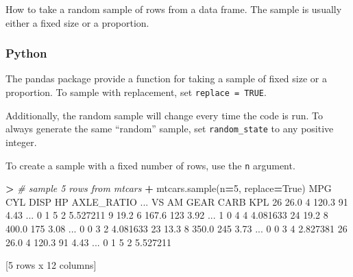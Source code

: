 \documentclass[
]{book}
\newenvironment{Shaded}{\begin{snugshade}}{\end{snugshade}}
\newcommand{\CommentTok}[1]{\textcolor[rgb]{0.56,0.35,0.01}{\textit{#1}}}
\newcommand{\DecValTok}[1]{\textcolor[rgb]{0.00,0.00,0.81}{#1}}
\newcommand{\FloatTok}[1]{\textcolor[rgb]{0.00,0.00,0.81}{#1}}
\newcommand{\NormalTok}[1]{#1}
\newcommand{\OperatorTok}[1]{\textcolor[rgb]{0.81,0.36,0.00}{\textbf{#1}}}
\newcommand{\VariableTok}[1]{\textcolor[rgb]{0.00,0.00,0.00}{#1}}
\begin{document}
How to take a random sample of rows from a data frame. The sample is usually either a fixed size or a proportion.

\hypertarget{python-29}{%
\subsubsection*{Python}\label{python-29}}

The pandas package provide a function for taking a sample of fixed size or a proportion. To sample with replacement, set \texttt{replace\ =\ TRUE}.

Additionally, the random sample will change every time the code is run. To always generate the same ``random'' sample, set \texttt{random\_state} to any positive integer.

To create a sample with a fixed number of rows, use the \texttt{n} argument.

\begin{Shaded}
\begin{Highlighting}[]
\OperatorTok{\textgreater{}} \CommentTok{\# sample 5 rows from mtcars}
\OperatorTok{+}\NormalTok{ mtcars.sample(n}\OperatorTok{=}\DecValTok{5}\NormalTok{, replace}\OperatorTok{=}\VariableTok{True}\NormalTok{)}
\NormalTok{     MPG  CYL   DISP   HP  AXLE\_RATIO  ...  VS  AM  GEAR CARB       KPL}
\DecValTok{26}  \FloatTok{26.0}    \DecValTok{4}  \FloatTok{120.3}   \DecValTok{91}        \FloatTok{4.43}\NormalTok{  ...   }\DecValTok{0}   \DecValTok{1}     \DecValTok{5}    \DecValTok{2}  \FloatTok{5.527211}
\DecValTok{9}   \FloatTok{19.2}    \DecValTok{6}  \FloatTok{167.6}  \DecValTok{123}        \FloatTok{3.92}\NormalTok{  ...   }\DecValTok{1}   \DecValTok{0}     \DecValTok{4}    \DecValTok{4}  \FloatTok{4.081633}
\DecValTok{24}  \FloatTok{19.2}    \DecValTok{8}  \FloatTok{400.0}  \DecValTok{175}        \FloatTok{3.08}\NormalTok{  ...   }\DecValTok{0}   \DecValTok{0}     \DecValTok{3}    \DecValTok{2}  \FloatTok{4.081633}
\DecValTok{23}  \FloatTok{13.3}    \DecValTok{8}  \FloatTok{350.0}  \DecValTok{245}        \FloatTok{3.73}\NormalTok{  ...   }\DecValTok{0}   \DecValTok{0}     \DecValTok{3}    \DecValTok{4}  \FloatTok{2.827381}
\DecValTok{26}  \FloatTok{26.0}    \DecValTok{4}  \FloatTok{120.3}   \DecValTok{91}        \FloatTok{4.43}\NormalTok{  ...   }\DecValTok{0}   \DecValTok{1}     \DecValTok{5}    \DecValTok{2}  \FloatTok{5.527211}

\NormalTok{[}\DecValTok{5}\NormalTok{ rows x }\DecValTok{12}\NormalTok{ columns]}
\end{Highlighting}
\end{Shaded}
\end{document}
